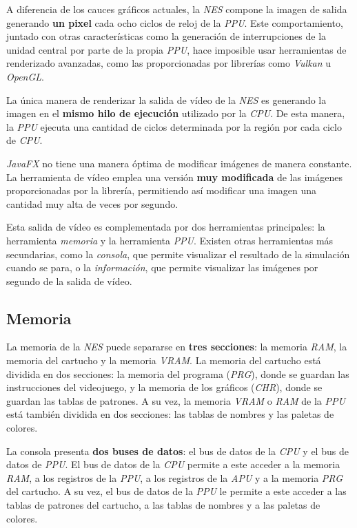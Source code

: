 A diferencia de los cauces gráficos actuales, la \textit{NES}
compone la imagen de salida generando \textbf{un pixel} cada
ocho ciclos de reloj de la \textit{PPU}.
Este comportamiento, juntado con otras características como
la generación de interrupciones de la unidad central
por parte de la propia \textit{PPU}, hace imposible usar
herramientas de renderizado avanzadas, como las proporcionadas
por librerías como \textit{Vulkan} u \textit{OpenGL}.

La única manera de renderizar la salida de vídeo de la \textit{NES}
es generando la imagen en el \textbf{mismo hilo de ejecución}
utilizado por la \textit{CPU}.
De esta manera, la \textit{PPU} ejecuta una cantidad de ciclos
determinada por la región por cada ciclo de \textit{CPU}.

\textit{JavaFX} no tiene una manera óptima de modificar
imágenes de manera constante.
La herramienta de vídeo emplea una versión \textbf{muy modificada}
de las imágenes proporcionadas por la librería,
permitiendo así modificar una imagen una cantidad muy alta
de veces por segundo.

Esta salida de vídeo es complementada por dos herramientas principales:
la herramienta \textit{memoria} y la herramienta \textit{PPU}.
Existen otras herramientas más secundarias, como la \textit{consola}, que permite
visualizar el resultado de la simulación cuando se para, o
la \textit{información}, que permite visualizar las imágenes por segundo
de la salida de vídeo.

\subsection{Memoria}\label{subsec:memoria}

La memoria de la \textit{NES} puede separarse en \textbf{tres secciones}:
la memoria \textit{RAM}, la memoria del cartucho y la memoria \textit{VRAM}.
La memoria del cartucho está dividida en dos secciones:
la memoria del programa (\textit{PRG}), donde se guardan
las instrucciones del videojuego,
y la memoria de los gráficos (\textit{CHR}), donde se guardan
las tablas de patrones.
A su vez, la memoria \textit{VRAM} o \textit{RAM} de la \textit{PPU}
está también dividida en dos secciones:
las tablas de nombres y las paletas de colores.

La consola presenta \textbf{dos buses de datos}:
el bus de datos de la \textit{CPU}
y el bus de datos de \textit{PPU}.
El bus de datos de la \textit{CPU} permite a
este acceder a la memoria \textit{RAM},
a los registros de la \textit{PPU},
a los registros de la \textit{APU}
y a la memoria \textit{PRG} del cartucho.
A su vez, el bus de datos de la \textit{PPU}
le permite a este acceder a las tablas de patrones
del cartucho, a las tablas de nombres y a las paletas
de colores.

